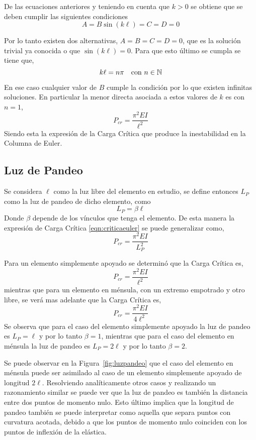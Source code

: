 De las ecuaciones anteriores y teniendo en cuenta que $k>0$ se obtiene que se deben cumplir las siguientes condiciones
\begin{equation}
A = B\sin(k\ell) = C = D = 0
\end{equation}

Por lo tanto existen dos alternativas, $A = B = C = D = 0$, que es la solución trivial ya conocida o que $\sin(k\ell) = 0$.
Para que esto último se cumpla se tiene que,
\begin{equation}
k \ell = n \pi  \quad \text{con} \,\, n\in {\mathbb N}
\end{equation}

En ese caso cualquier valor de $B$ cumple la condición por lo que existen infinitas soluciones. En particular la menor directa asociada a estos valores de $k$ es con $n=1$,
\begin{equation}\label{eqn:criticaeuler}
\boxed{P_{cr} = \frac{\pi^2 E I}{\ell^2}}
\end{equation}
Siendo esta la expresión de la Carga Crítica que produce la inestabilidad en la Columna de Euler.

\subsection{Luz de Pandeo}

Se considera $\ell$ como la luz libre del elemento en estudio, se define entonces $L_P$ como la luz de pandeo de dicho elemento, como
\begin{equation}
L_P=\beta\ell
\end{equation}
Donde $\beta$ depende de los vínculos que tenga el elemento. De esta manera la expresión de Carga Crítica \eqref{eqn:criticaeuler} se puede generalizar como,
\begin{equation}\label{eqn:criticageneral}
\boxed{P_{cr} = \frac{\pi^2 E I}{L_P^2}}
\end{equation}

Para un elemento simplemente apoyado se determinó que la Carga Crítica es,
$$P_{cr} = \frac{\pi^2 E I}{\ell^2}$$
mientras que para un elemento en ménsula, con un extremo empotrado y otro libre, se verá mas adelante que la Carga Crítica es,
$$P_{cr} = \frac{\pi^2 E I}{4\ell^2}$$
Se observa que para el caso del elemento simplemente apoyado la luz de pandeo es $L_P=\ell$ y por lo tanto $\beta=1$, mientras que para el caso del elemento en ménsula la luz de pandeo es $L_P=2\ell$ y por lo tanto $\beta=2$. 

Se puede observar en la Figura~\ref{fig:luzpandeo} que el caso del elemento en ménsula puede ser asimilado al caso de un elemento simplemente apoyado de longitud $2\ell$. Resolviendo analíticamente otros casos y realizando un razonamiento similar se puede ver que la luz de pandeo es también la distancia entre dos puntos de momento nulo. Esto último implica que la longitud de pandeo también se puede interpretar como aquella que separa puntos con curvatura acotada, debido a que los puntos de momento nulo coinciden con los puntos de inflexión de la elástica.

